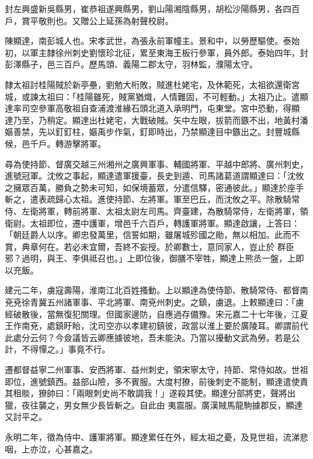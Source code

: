 \begin{pinyinscope}
 封左興盛新吳縣男，崔恭祖遂興縣男，劉山陽湘陰縣男，胡松沙陽縣男，各四百戶，賞平敬則也。又贈公上延孫為射聲校尉。



 陳顯達，南彭城人也。宋孝武世，為張永前軍幢主。景和中，以勞歷驅使。泰始初，以軍主隸徐州刺史劉懷珍北征，累至東海王板行參軍，員外郎。泰始四年，封彭澤縣子，邑三百戶。歷馬頭、義陽二郡太守，羽林監，濮陽太守。



 隸太祖討桂陽賊於新亭壘，劉勉大桁敗，賊進杜姥宅，及休範死，太祖欲還衛宮城，或諫太祖曰：「桂陽雖死，賊黨猶熾，人情難固，不可輕動。」太祖乃止。遣顯達率司空參軍高敬祖自查浦渡淮緣石頭北道入承明門，屯東堂。宮中恐動，得顯
 達乃至，乃稍定。顯達出杜姥宅，大戰破賊。矢中左眼，拔箭而鏃不出，地黃村潘嫗善禁，先以釘釘柱，嫗禹步作氣，釘即時出，乃禁顯達目中鏃出之。封豐城縣候，邑千戶。轉游擊將軍。



 尋為使持節、督廣交越三州湘州之廣興軍事、輔國將軍、平越中郎將、廣州刺史，進號冠軍。沈攸之事起，顯達遣軍援臺，長史到遁、司馬諸葛道謂顯達曰：「沈攸之擁眾百萬，勝負之勢未可知，如保境蓄眾，分遣信驛，密通彼此。」顯達於座手斬之，遣表疏歸心太祖。進使持節、左將軍。軍至巴丘，而沈攸之平。除散騎常侍、左衛將軍，轉前將軍、太祖太尉左司馬。齊臺建，為散騎常侍，左衛將軍，領衛尉。太祖即位，遷中護軍，增邑千六百戶，轉護軍將軍。顯達啟讓，上答曰：「朝廷爵人以序。卿忠發萬里，信誓如期，雖屠城殄國之勛，無以相加。此而不賞，典章何在。若必未宜爾，吾終不妄授。於卿數士，意同家人，豈止於
 群臣邪？過明，與王、李俱祗召也。」上即位後，御膳不宰牲，顯達上熊丞一盤，上即以充飯。



 建元二年，虜寇壽陽，淮南江北百姓搔動。上以顯達為使侍節、散騎常侍、都督南兗兗徐青冀五州諸軍事、平北將軍、南兗州刺史。之鎮，虜退。上敕顯達曰：「虜經破散後，當無復犯關理。但國家邊防，自應過存備豫。宋元嘉二十七年後，江夏王作南兗，處鎮盱眙，沈司空亦以孝建初鎮彼，政當以淮上要於廣陵耳。卿謂前代此處分云何？今僉議皆云卿應據彼地，吾未能決。乃當以擾動文武為勞。若是公計，不得憚之。」事竟不行。



 遷都督益寧二州軍事、安西將軍、益州刺史，領宋寧太守，持節、常侍如故。世祖即位，進號鎮西。益部山險，多不賓服。大度村獠，前後刺史不能制，顯達遣使責其租賧，獠帥曰：「兩眼刺史尚不敢調我！」遂殺其使。顯達分部將吏，聲將出獵，夜往襲之，男女無少長皆斬之。自此由
 夷震服。廣漢賊馬龍駒據郡反，顯達又討平之。



 永明二年，徵為侍中、護軍將軍。顯達累任在外，經太祖之憂，及見世祖，流涕悲咽，上亦泣，心甚嘉之。




\end{pinyinscope}
